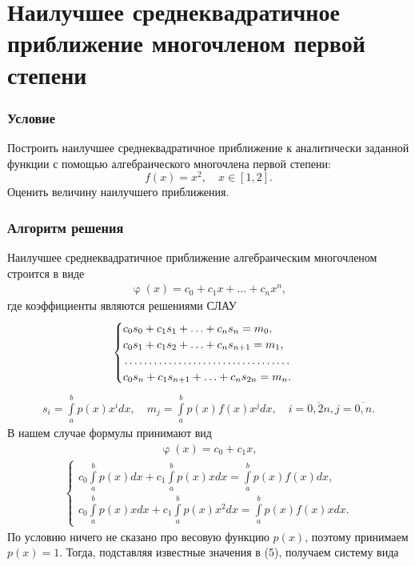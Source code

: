 \documentclass[a4paper, 12pt]{article}
\renewcommand{\varphi}{\upvarphi}
\begin{document}
	\section*{Наилучшее среднеквадратичное приближение многочленом первой степени}
	\subsubsection*{Условие}
	Построить наилучшее среднеквадратичное приближение к аналитически заданной функции с помощью алгебраического многочлена первой степени: $$f(x) = x^2,\quad x \in [1,2].$$ Оценить величину наилучшего приближения.
	\subsubsection*{Алгоритм решения}
	Наилучшее среднеквадратичное приближение алгебраическим многочленом строится в виде \begin{eqnarray}
	\varphi(x) = c_0 + c_1x + \ldots +c_nx^n,
	\end{eqnarray} где коэффициенты являются решениями СЛАУ
	\begin{eqnarray}
		\begin{cases}
			c_0s_0 + c_1s_1 + \ldots + c_ns_n = m_0,\\
			c_0s_1 + c_1s_2 + \ldots + c_ns_{n+1} = m_1,\\
			\dotfill\\
			c_0s_n + c_1s_{n+1} + \ldots + c_ns_{2n} = m_n.
		\end{cases}
	\end{eqnarray}
	\begin{eqnarray}
		s_i = \int\limits_a^b p(x) x^i dx,\quad m_j= \int\limits_a^b p(x) f(x) x^j dx,\quad i=\overline{0,2n}, j=\overline{0,n}.
	\end{eqnarray}
	В нашем случае формулы принимают вид \begin{eqnarray}
		\varphi(x) = c_0 + c_1x,
	\end{eqnarray}
	\begin{eqnarray}
			\begin{cases}
			c_0\int\limits_a^b p(x) dx+ c_1\int\limits_a^b p(x) x dx= \int\limits_a^b p(x)f(x)dx,\\
			c_0\int\limits_a^b p(x)x dx+ c_1\int\limits_a^b p(x) x^2 dx= \int\limits_a^b p(x)f(x)xdx.
		\end{cases}
	\end{eqnarray}
	По условию ничего не сказано про весовую функцию $p(x)$, поэтому принимаем $p(x) = 1$. Тогда, подставляя известные значения в (5), получаем систему вида 
\end{document}
